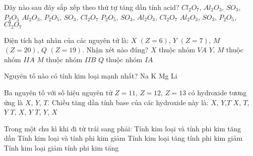 \documentclass[Main_HOA10.tex]{subfiles}
\begin{document}
\begin{ex}%
	Dãy nào sau đây sắp xếp theo thứ tự tăng dần tính acid?
	\choice
	{ $Cl_2O_7$,  $Al_2O_3$,  $SO_3$,  $P_2O_5$}
	{ $Al_2O_3$,  $P_2O_5$,  $SO_3$,  $Cl_2O_7$}
	{ $P_2O_5$,  $SO_3$,  $Al_2O_3$,  $Cl_2O_7$}
	{ $Al_2O_3$,  $SO_3$,  $P_2O_5$,  $Cl_2O_7$}
\end{ex}
\begin{ex}%
	Điện tích hạt nhân của các nguyên tử là: $X$ $(Z=6)$, $Y$ $(Z=7)$, $M$ $(Z=20)$, $Q$ $(Z=19)$. Nhận xét nào đúng?
	\choice
	{$X$ thuộc nhóm $VA$}
	{$Y$, $M$ thuộc nhóm $IIA$}
	{$M$ thuộc nhóm $IIB$}
	{\True $Q$ thuộc nhóm $IA$}
\end{ex}
\begin{ex}%
	Nguyên tố nào có tính kim loại mạnh nhất?
	\choice
	{Na}
	{K}
	{Mg}
	{Li}
\end{ex}
\begin{ex}%
	Ba nguyên tố với số hiệu nguyên tử $Z=11$, $Z=12$, $Z=13$ có hydroxide tương ứng là $X$, $Y$, $T$. Chiều tăng dần tính base của các hydroxide này là:
	\choice
	{\True $X$, $Y$,$ T$}
	{$X$, $T$, $Y$}
	{$T$, $X$, $Y$}
	{$T$, $Y$, $X$}
\end{ex}
\begin{ex}%
	Trong một chu kì khi đi từ trái sang phải:
	\choice
	{Tính kim loại và tính phi kim tăng dần}
	{Tính kim loại và tính phi kim giảm}
	{Tính kim loại tăng tính phi kim giảm}
	{\True Tính kim loại giảm tính phi kim tăng}
\end{ex}
\end{document}
